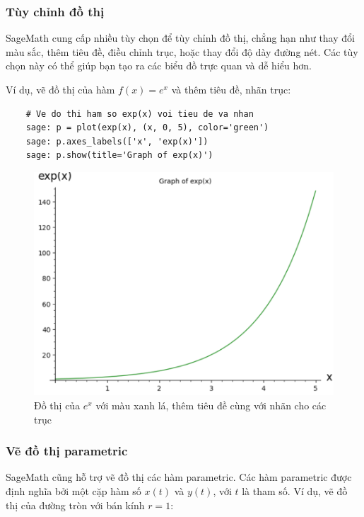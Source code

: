 \subsubsection{Tùy chỉnh đồ thị}

SageMath cung cấp nhiều tùy chọn để tùy chỉnh đồ thị, chẳng hạn như thay đổi màu sắc, thêm tiêu đề, điều chỉnh trục, hoặc thay đổi độ dày đường nét. Các tùy chọn này có thể giúp bạn tạo ra các biểu đồ trực quan và dễ hiểu hơn.

Ví dụ, vẽ đồ thị của hàm \( f(x) = e^x \) và thêm tiêu đề, nhãn trục:

\begin{lstlisting}
	# Ve do thi ham so exp(x) voi tieu de va nhan
	sage: p = plot(exp(x), (x, 0, 5), color='green')
	sage: p.axes_labels(['x', 'exp(x)'])
	sage: p.show(title='Graph of exp(x)')
\end{lstlisting}
\begin{figure}
	\centering
	\includegraphics[width=0.7\linewidth]{images/screenshot011}
	\caption{Đồ thị của \( e^x \) với màu xanh lá, thêm tiêu đề cùng với nhãn cho các trục}
	\label{fig:screenshot011}
\end{figure}

\subsubsection{Vẽ đồ thị parametric}

SageMath cũng hỗ trợ vẽ đồ thị các hàm parametric. Các hàm parametric được định nghĩa bởi một cặp hàm số \( x(t) \) và \( y(t) \), với \( t \) là tham số. Ví dụ, vẽ đồ thị của đường tròn với bán kính \(r = 1\):

